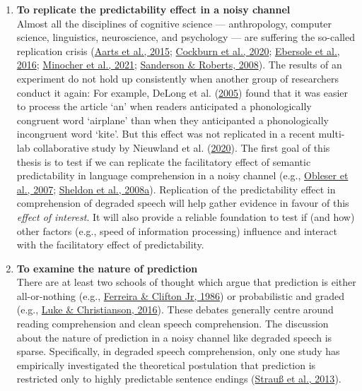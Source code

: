 \documentclass[a4paper, nobind]{templates/ociamthesis}
\begin{document}
\begin{enumerate}
\def\labelenumi{(\arabic{enumi})}
\item
  \textbf{To replicate the predictability effect in a noisy channel}\\
  Almost all the disciplines of cognitive science --- anthropology, computer science, linguistics, neuroscience, and psychology --- are suffering the so-called replication crisis (\protect\hyperlink{ref-OSC2015}{Aarts et al., 2015}; \protect\hyperlink{ref-Cockburn2020}{Cockburn et al., 2020}; \protect\hyperlink{ref-Ebersole2016}{Ebersole et al., 2016}; \protect\hyperlink{ref-Minocher2021}{Minocher et al., 2021}; \protect\hyperlink{ref-Sanderson2008}{Sanderson \& Roberts, 2008}).
  The results of an experiment do not hold up consistently when another group of researchers conduct it again:
  For example, DeLong et al. (\protect\hyperlink{ref-Delong2005}{2005}) found that it was easier to process the article `an' when readers anticipated a phonologically congruent word `airplane' than when they anticipanted a phonologically incongruent word `kite'.
  But this effect was not replicated in a recent multi-lab collaborative study by Nieuwland et al. (\protect\hyperlink{ref-Nieuwland2020a}{2020}).
  The first goal of this thesis is to test if we can replicate the facilitatory effect of semantic predictability in language comprehension in a noisy channel (e.g., \protect\hyperlink{ref-Obleser2007}{Obleser et al., 2007}; \protect\hyperlink{ref-Sheldon2008a}{Sheldon et al., 2008a}).
  Replication of the predictability effect in comprehension of degraded speech
  will help gather evidence in favour of this \emph{effect of interest}.
  It will also provide a reliable foundation to test if (and how) other factors (e.g., speed of information processing) influence and interact with the facilitatory effect of predictability.
\item
  \textbf{To examine the nature of prediction}\\
  There are at least two schools of thought which argue that prediction is either all-or-nothing (e.g., \protect\hyperlink{ref-Ferreira1986}{Ferreira \& Clifton Jr, 1986}) or probabilistic and graded (e.g., \protect\hyperlink{ref-Luke2016}{Luke \& Christianson, 2016}).
  These debates generally centre around reading comprehension and clean speech comprehension.
  The discussion about the nature of prediction in a noisy channel like degraded speech is sparse.
  Specifically, in degraded speech comprehension, only one study has empirically investigated the theoretical postulation that prediction is restricted only to highly predictable sentence endings (\protect\hyperlink{ref-Strauss2013}{Strauß et al., 2013}).

\end{enumerate}
\end{document}
